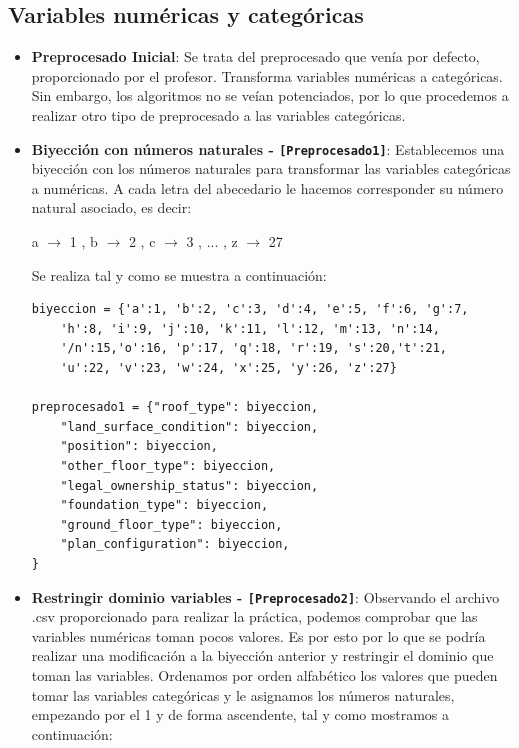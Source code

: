\subsection{Variables numéricas y categóricas}
\begin{itemize}
	\item \textbf{Preprocesado Inicial}: Se trata del preprocesado que venía por defecto, proporcionado por el profesor. Transforma variables numéricas a categóricas. Sin embargo, los algoritmos no se veían potenciados, por lo que procedemos a realizar otro tipo de preprocesado a las variables categóricas.
	
	
	\item \textbf{Biyección con números naturales -  \texttt{[Preprocesado1]}}: Establecemos una biyección con los números naturales para transformar las variables categóricas a numéricas. A cada letra del abecedario le hacemos corresponder su número natural asociado, es decir:
	
	a $\rightarrow$ 1 , b $\rightarrow$ 2 , c $\rightarrow$ 3 , ... , z $\rightarrow$ 27
	
	Se realiza tal y como se muestra a continuación:

	\begin{lstlisting}[frame=single]
biyeccion = {'a':1, 'b':2, 'c':3, 'd':4, 'e':5, 'f':6, 'g':7, 
	'h':8, 'i':9, 'j':10, 'k':11, 'l':12, 'm':13, 'n':14, 
	'/n':15,'o':16, 'p':17, 'q':18, 'r':19, 's':20,'t':21, 
	'u':22, 'v':23, 'w':24, 'x':25, 'y':26, 'z':27}
	
preprocesado1 = {"roof_type": biyeccion,
	"land_surface_condition": biyeccion,
	"position": biyeccion,
	"other_floor_type": biyeccion,
	"legal_ownership_status": biyeccion,
	"foundation_type": biyeccion,  
	"ground_floor_type": biyeccion,
	"plan_configuration": biyeccion,
}
	\end{lstlisting}
	
	
	\item \textbf{Restringir dominio variables  - \texttt{[Preprocesado2]}}:
	Observando el archivo .csv proporcionado para realizar la práctica, podemos comprobar que las variables numéricas toman pocos valores. Es por esto por lo que se podría realizar una modificación a la biyección anterior y restringir el dominio que toman las variables.
	Ordenamos por orden alfabético los valores que pueden tomar las variables categóricas y le asignamos los números naturales, empezando por el 1 y de forma ascendente, tal y como mostramos a continuación:
	
	\begin{lstlisting}[frame=single]
	

\end{lstlisting}
\end{itemize}
